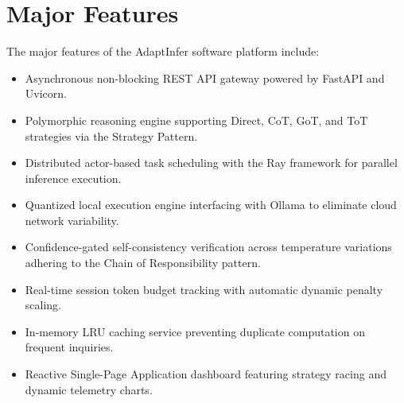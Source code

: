 \documentclass[12pt,a4paper]{report}
\begin{document}
\section{Major Features}
\label{sec:major_features}
The major features of the AdaptInfer software platform include:
\begin{itemize}[leftmargin=*]
    \item Asynchronous non-blocking REST API gateway powered by FastAPI and Uvicorn.
    \item Polymorphic reasoning engine supporting Direct, CoT, GoT, and ToT strategies via the Strategy Pattern.
    \item Distributed actor-based task scheduling with the Ray framework for parallel inference execution.
    \item Quantized local execution engine interfacing with Ollama to eliminate cloud network variability.
    \item Confidence-gated self-consistency verification across temperature variations adhering to the Chain of Responsibility pattern.
    \item Real-time session token budget tracking with automatic dynamic penalty scaling.
    \item In-memory LRU caching service preventing duplicate computation on frequent inquiries.
    \item Reactive Single-Page Application dashboard featuring strategy racing and dynamic telemetry charts.
\end{itemize}
\end{document}

